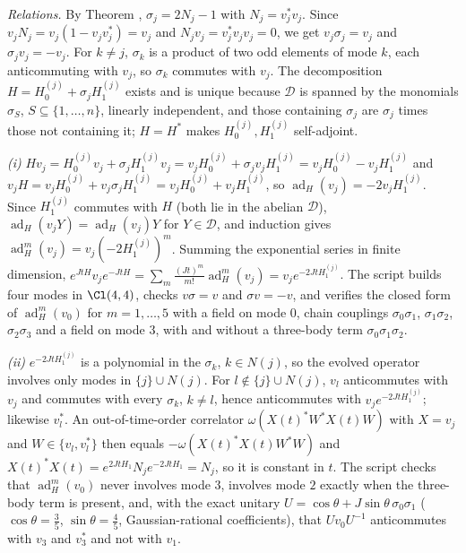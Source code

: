 \emph{Relations.} By Theorem , $\sigma_{j} = 2N_{j} - 1$ with $N_{j} = v_{j}^{*}v_{j}$. Since $v_{j}N_{j} = v_{j}(1 - v_{j}v_{j}^{*}) = v_{j}$ and $N_{j}v_{j} = v_{j}^{*}v_{j}v_{j} = 0$, we get $v_{j}\sigma_{j} = v_{j}$ and $\sigma_{j}v_{j} = -v_{j}$. For $k \neq j$, $\sigma_{k}$ is a product of two odd elements of mode $k$, each anticommuting with $v_{j}$, so $\sigma_{k}$ commutes with $v_{j}$. The decomposition $H = H_{0}^{(j)} + \sigma_{j}H_{1}^{(j)}$ exists and is unique because $\mathcal{D}$ is spanned by the monomials $\sigma_{S}$, $S \subseteq \{1, \dots, n\}$, linearly independent, and those containing $\sigma_{j}$ are $\sigma_{j}$ times those not containing it; $H = H^{*}$ makes $H_{0}^{(j)}, H_{1}^{(j)}$ self-adjoint.

\emph{(i)} $Hv_{j} = H_{0}^{(j)}v_{j} + \sigma_{j}H_{1}^{(j)}v_{j} = v_{j}H_{0}^{(j)} + \sigma_{j}v_{j}H_{1}^{(j)} = v_{j}H_{0}^{(j)} - v_{j}H_{1}^{(j)}$ and $v_{j}H = v_{j}H_{0}^{(j)} + v_{j}\sigma_{j}H_{1}^{(j)} = v_{j}H_{0}^{(j)} + v_{j}H_{1}^{(j)}$, so $\operatorname{ad}_{H}(v_{j}) = -2v_{j}H_{1}^{(j)}$. Since $H_{1}^{(j)}$ commutes with $H$ (both lie in the abelian $\mathcal{D}$), $\operatorname{ad}_{H}(v_{j}Y) = \operatorname{ad}_{H}(v_{j})Y$ for $Y \in \mathcal{D}$, and induction gives $\operatorname{ad}_{H}^{m}(v_{j}) = v_{j}(-2H_{1}^{(j)})^{m}$. Summing the exponential series in finite dimension, $e^{JtH}v_{j}e^{-JtH} = \sum_{m}\tfrac{(Jt)^{m}}{m!}\operatorname{ad}_{H}^{m}(v_{j}) = v_{j}e^{-2JtH_{1}^{(j)}}$. The script builds four modes in $\Cl(4,4)$, checks $v\sigma = v$ and $\sigma v = -v$, and verifies the closed form of $\operatorname{ad}_{H}^{m}(v_{0})$ for $m = 1, \dots, 5$ with a field on mode $0$, chain couplings $\sigma_{0}\sigma_{1}$, $\sigma_{1}\sigma_{2}$, $\sigma_{2}\sigma_{3}$ and a field on mode $3$, with and without a three-body term $\sigma_{0}\sigma_{1}\sigma_{2}$.

\emph{(ii)} $e^{-2JtH_{1}^{(j)}}$ is a polynomial in the $\sigma_{k}$, $k \in N(j)$, so the evolved operator involves only modes in $\{j\}\cup N(j)$. For $l \notin \{j\}\cup N(j)$, $v_{l}$ anticommutes with $v_{j}$ and commutes with every $\sigma_{k}$, $k \neq l$, hence anticommutes with $v_{j}e^{-2JtH_{1}^{(j)}}$; likewise $v_{l}^{*}$. An out-of-time-order correlator $\omega(X(t)^{*}W^{*}X(t)W)$ with $X = v_{j}$ and $W \in \{v_{l}, v_{l}^{*}\}$ then equals $-\omega(X(t)^{*}X(t)W^{*}W)$ and $X(t)^{*}X(t) = e^{2JtH_{1}}N_{j}e^{-2JtH_{1}} = N_{j}$, so it is constant in $t$. The script checks that $\operatorname{ad}_{H}^{m}(v_{0})$ never involves mode $3$, involves mode $2$ exactly when the three-body term is present, and, with the exact unitary $U = \cos\theta + J\sin\theta\,\sigma_{0}\sigma_{1}$ ($\cos\theta = \tfrac35$, $\sin\theta = \tfrac45$, Gaussian-rational coefficients), that $Uv_{0}U^{-1}$ anticommutes with $v_{3}$ and $v_{3}^{*}$ and not with $v_{1}$.

